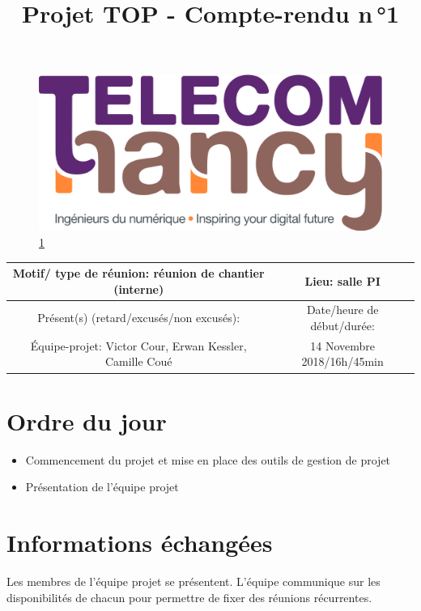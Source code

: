\documentclass{article}
\date{}
\begin{document}
\begin{figure}
    \centering
    \includegraphics[scale=0.05]{logo_TNCY.png}
    \label{fig:logo_tncy}
    \ref{fig:logo_tncy}
\end{figure}
\title{Projet TOP - Compte-rendu n\,°1}
\maketitle
\vspace*{-1cm}


\begin{tabular}{|c|c|}
  \hline
  Motif/ type de réunion: réunion de chantier (interne) & Lieu: salle PI  \\
  \hline
   Présent(s) (retard/excusés/non excusés): &  Date/heure de début/durée:\\
  Équipe-projet: Victor Cour,
                  Erwan Kessler,
                  Camille Coué
 & 14 Novembre 2018/16h/45min \\
  \hline
\end{tabular}

\section{Ordre du jour}
\begin{itemize}
  \item Commencement du projet et mise en place des outils de gestion de projet
  \item Présentation de l'équipe projet
\end{itemize}


\section{Informations échangées}
Les membres de l'équipe projet se présentent.
L'équipe communique sur les disponibilités de chacun pour permettre de fixer des réunions récurrentes.
\end{document}
